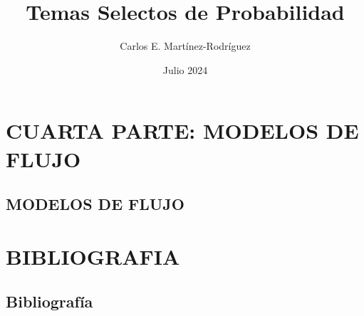 \documentclass{report}
\title{Temas Selectos de Probabilidad}
\author{Carlos E. Martínez-Rodríguez}
\date{Julio 2024}
\begin{document}
\maketitle

\tableofcontents

\part{CUARTA PARTE: MODELOS DE FLUJO}




\chapter{MODELOS DE FLUJO}


\part{BIBLIOGRAFIA}

\chapter{Bibliografía}

\end{document}
